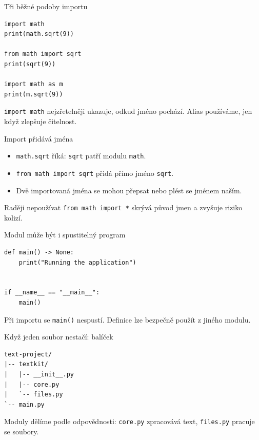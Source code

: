 \documentclass[aspectratio=169]{beamer}
\begin{document}
\begin{frame}[fragile]{Tři běžné podoby importu}
\begin{lstlisting}[style=pythonSmall]
import math
print(math.sqrt(9))

from math import sqrt
print(sqrt(9))

import math as m
print(m.sqrt(9))
\end{lstlisting}
  \texttt{import math} nejzřetelněji ukazuje, odkud jméno pochází. Alias používáme, jen když zlepšuje čitelnost.
\end{frame}

\begin{frame}{Import přidává jména}
  \begin{itemize}
    \item \texttt{math.sqrt} říká: \texttt{sqrt} patří modulu \texttt{math}.
    \item \texttt{from math import sqrt} přidá přímo jméno \texttt{sqrt}.
    \item Dvě importovaná jména se mohou přepsat nebo plést se jménem naším.
  \end{itemize}
  \begin{alertblock}{Raději nepoužívat}
    \texttt{from math import *} skrývá původ jmen a zvyšuje riziko kolizí.
  \end{alertblock}
\end{frame}

\begin{frame}[fragile]{Modul může být i spustitelný program}
\begin{lstlisting}[style=python]
def main() -> None:
    print("Running the application")


if __name__ == "__main__":
    main()
\end{lstlisting}
  Při importu se \texttt{main()} nespustí. Definice lze bezpečně použít z jiného modulu.
\end{frame}

\begin{frame}[fragile]{Když jeden soubor nestačí: balíček}
\begin{lstlisting}[basicstyle=\ttfamily\large,columns=fullflexible]
text-project/
|-- textkit/
|   |-- __init__.py
|   |-- core.py
|   `-- files.py
`-- main.py
\end{lstlisting}
  Moduly dělíme podle odpovědnosti: \texttt{core.py} zpracovává text, \texttt{files.py} pracuje se soubory.
\end{frame}
\end{document}
